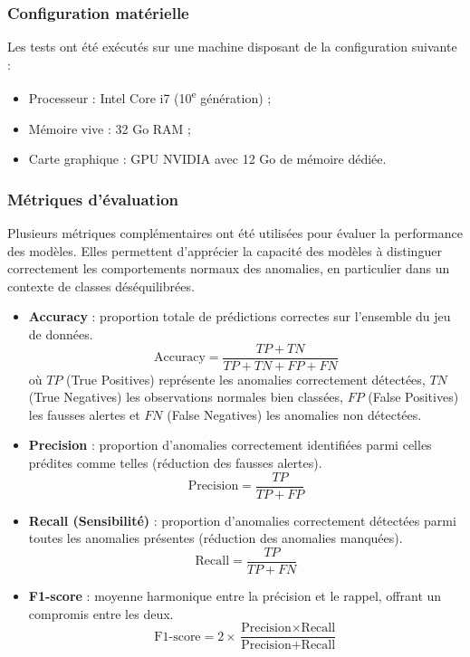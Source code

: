 \documentclass[conference]{IEEEtran}
\begin{document}
\subsubsection{Configuration matérielle}
Les tests ont été exécutés sur une machine disposant de la configuration suivante :
\begin{itemize}
    \item Processeur : Intel Core i7 (10\textsuperscript{e} génération) ;
    \item Mémoire vive : 32 Go RAM ;
    \item Carte graphique : GPU NVIDIA avec 12 Go de mémoire dédiée.
\end{itemize}

\subsubsection{Métriques d’évaluation}

Plusieurs métriques complémentaires ont été utilisées pour évaluer la performance des modèles.  
Elles permettent d’apprécier la capacité des modèles à distinguer correctement les comportements normaux des anomalies, en particulier dans un contexte de classes déséquilibrées.

\begin{itemize}
    \item \textbf{Accuracy} : proportion totale de prédictions correctes sur l’ensemble du jeu de données.
    \[
    \text{Accuracy} = \frac{TP + TN}{TP + TN + FP + FN}
    \]
    où $TP$ (True Positives) représente les anomalies correctement détectées, $TN$ (True Negatives) les observations normales bien classées, $FP$ (False Positives) les fausses alertes et $FN$ (False Negatives) les anomalies non détectées.
    
    \item \textbf{Precision} : proportion d’anomalies correctement identifiées parmi celles prédites comme telles (réduction des fausses alertes).
    \[
    \text{Precision} = \frac{TP}{TP + FP}
    \]
    
    \item \textbf{Recall (Sensibilité)} : proportion d’anomalies correctement détectées parmi toutes les anomalies présentes (réduction des anomalies manquées).
    \[
    \text{Recall} = \frac{TP}{TP + FN}
    \]
    
    \item \textbf{F1-score} : moyenne harmonique entre la précision et le rappel, offrant un compromis entre les deux.
    \[
    \text{F1-score} = 2 \times \frac{\text{Precision} \times \text{Recall}}{\text{Precision} + \text{Recall}}
    \]
\end{itemize}
\end{document}
